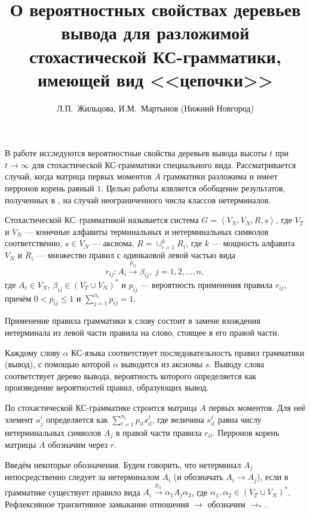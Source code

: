 \documentclass{article}
\title{О вероятностных свойствах деревьев вывода для разложимой стохастической КС-грамматики, имеющей вид <<цепочки>>}
\author{Л.П.~Жильцова, И.М.~Мартынов (Нижний Новгород)}
\date{}
\begin{document}
\maketitle

В работе исследуются вероятностные свойства деревьев вывода высоты $t$ при $t \rightarrow \infty$ для стохастической КС-грамматики специального вида. Рассматривается случай, когда матрица первых моментов $A$ грамматики разложима и имеет перронов корень равный $1$. Целью работы ялвляется обобщение результатов, полученных в \cite{borisov-disser}, на случай неограниченного числа классов нетерминалов.

Стохастической КС--грамматикой называется система $G = \left< V_N, V_N, R, s \right>$, где $V_T$ и $V_N$ --- конечные алфавиты терминальных и нетерминальных символов соответственно, $s \in V_N$ --- аксиома, $R = \cup_{i = 1}^k R_i$, где $k$ --- мощность алфавита $V_N$ и $R_i$ --- множество правил с одинкаовой левой частью вида
\begin{equation*}
    r_{ij} : A_i \xrightarrow{p_{ij}} \beta_{ij},\;j = 1,2,\ldots,n,
\end{equation*}
где $A_i \in V_N$, $\beta_{ij} \in (V_T \cup V_N)^*$ и $p_{ij}$ --- вероятность применения правила $r_{ij}$, причём $0 < p_{ij} \leqslant 1$ и $\sum_{j = 1}^{n_i} p_{ij} = 1$.

Применение правила грамматики к слову состоит в замене вхождения нетерминала из левой части правила на слово, стоящее в его правой части.

Каждому слову $\alpha$ КС-языка соответствует последовательность правил грамматики (вывод), с помощью которой $\alpha$ выводится из аксиомы $s$. Выводу слова соответствует дерево вывода, вероятность которого определяется как произведение вероятностей правил, образующих вывод.

По стохастической КС-грамматике строится матрица $A$ первых моментов. Для неё элемент $a^i_j$ определяется как $\sum_{l = 1}^{n_i} p_{il} s_{il}^j$, где величина $s_{il}^j$ равна числу нетерминальных символов $A_j$ в правой части правила $r_{il}$. Перронов корень матрицы $A$ обозначим через $r$.

Введём некоторые обозначения. Будем говорить, что нетерминал $A_j$ непосредственно следует за нетерминалом $A_i$ (и обозначать $A_i \rightarrow A_j$), если в грамматике существует правило вида $A_i \xrightarrow{p_{il}} \alpha_1 A_j \alpha_2$, где $\alpha_1, \alpha_2 \in (V_T \cup V_N)^*$. Рефлексивное транзитивное замыкание отношения $\rightarrow$ обозначим $\rightarrow_*$.
\end{document}
